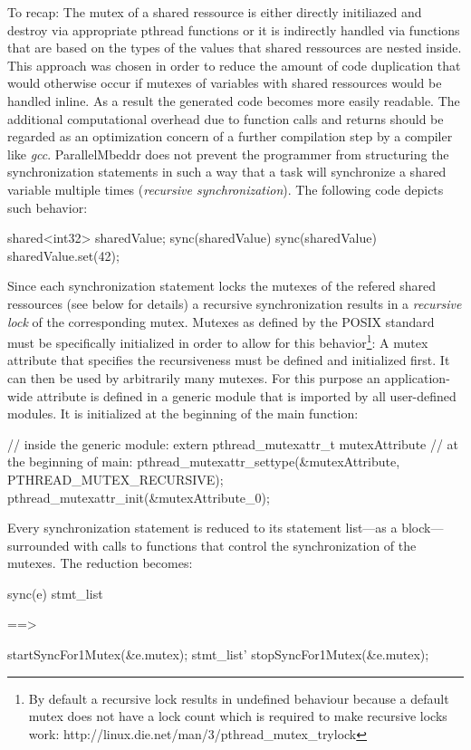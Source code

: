 To recap: The mutex of a shared ressource is either directly initiliazed and destroy via appropriate pthread functions or it is indirectly handled via functions that are based on the types of the values that shared ressources are nested inside. This approach was chosen in order to reduce the amount of code duplication that would otherwise occur if mutexes of variables with shared ressources would be handled inline. As a result the generated code becomes more easily readable. The additional computational overhead due to function calls and returns should be regarded as an optimization concern of a further compilation step by a compiler like \textit{gcc}.
ParallelMbeddr does not prevent the programmer from structuring the synchronization statements in such a way that a task will synchronize a shared variable multiple times (\textit{recursive synchronization}). The following code depicts such behavior:
\begin{ccode}
shared<int32> sharedValue;
sync(sharedValue) {
  sync(sharedValue) {
    sharedValue.set(42);
  }
}
\end{ccode}
Since each synchronization statement locks the mutexes of the refered shared ressources (see below for details) a recursive synchronization results in a \textit{recursive lock} of the corresponding mutex. Mutexes as defined by the POSIX standard must be specifically initialized in order to allow for this behavior\footnote{By default a recursive lock results in undefined behaviour because a default mutex does not have a lock count which is required to make recursive locks work: http://linux.die.net/man/3/pthread\_mutex\_trylock}: A mutex attribute that specifies the recursiveness must be defined and initialized first. It can then be used by arbitrarily many mutexes. 
For this purpose an application-wide attribute is defined in a generic module that is imported by all user-defined modules. It is initialized at the beginning of the main function:
\begin{ccode}
// inside the generic module:
extern pthread_mutexattr_t mutexAttribute
// at the beginning of main:
pthread_mutexattr_settype(&mutexAttribute, PTHREAD_MUTEX_RECURSIVE);
pthread_mutexattr_init(&mutexAttribute_0);
\end{ccode}
Every synchronization statement is reduced to its statement list---as a block---surrounded with calls to functions that control the synchronization of the mutexes. The reduction becomes:

\begin{center}
\begin{minipage}{0.4\textwidth}
\begin{ccode}
sync(e) stmt_list
\end{ccode}
\end{minipage}
\qquad==>\qquad
\begin{minipage}{0.4\textwidth}
\begin{ccode}
startSyncFor1Mutex(&e.mutex);
stmt_list'
stopSyncFor1Mutex(&e.mutex);
\end{ccode}
\end{minipage}
\end{center}



